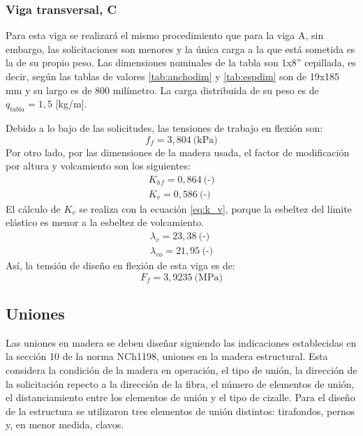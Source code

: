 
\subsubsection{Viga transversal, C}
Para esta viga se realizará el mismo procedimiento que para la viga A, sin embargo, las solicitaciones son menores y la única carga a la que está sometida es la de su propio peso. Las dimensiones nominales de la tabla son 1x8'' cepillada, es decir, según las tablas de valores \ref{tab:anchodim} y \ref{tab:espdim} son de 19x185 mm y su largo es de 800 milímetro. La carga distribuida de su peso es de $q_{tabla}=1,5$ [kg/m].

Debido a lo bajo de las solicitudes, las tensiones de trabajo en flexión son:
\begin{equation}
	f_f = 3,804 \: \text{(kPa)} 
\end{equation}
Por otro lado, por las dimensiones de la madera usada, el factor de modificación por altura y volcamiento son los siguientes:
\begin{gather*}
	K_{hf} = 0,864\: \text{(-)}\\
	K_{v} = 0,586\: \text{(-)}
\end{gather*}
El cálculo de $K_v$ se realiza con la ecuación \ref{eq:k_v}, porque la esbeltez del límite elástico es menor a la esbeltez de volcamiento.
\begin{gather*}
	\lambda_v = 23,38 \: \text{(-)}\\
	\lambda_{vo} = 21,95 \: \text{(-)}
\end{gather*}
Así, la tensión de diseño en flexión de esta viga es de:
\begin{equation}
	F_f = 3,9235 \: \text{(MPa)}
\end{equation}

\newpage 												%

\subsection{Uniones}
Las uniones en madera se deben diseñar siguiendo las indicaciones establecidas en la sección 10 de la norma NCh1198, uniones en la madera estructural. Esta considera la condición de la madera en operación, el tipo de unión, la dirección de la solicitación repecto a la dirección de la fibra, el número de elementos de unión, el distanciamiento entre los elementos de unión y el tipo de cizalle. Para el diseño de la estructura se utilizaron tres elementos de unión distintos: tirafondos, pernos y, en menor medida, clavos.

